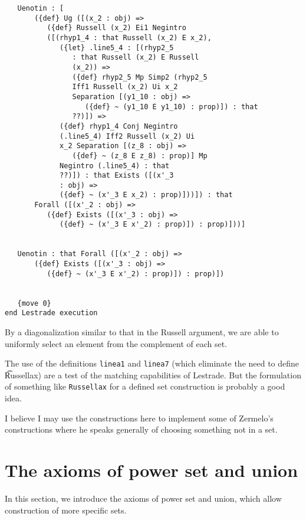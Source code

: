 \documentclass[12pt]{article}
\begin{document}
\begin{verbatim}
   Uenotin : [
       ({def} Ug ([(x_2 : obj) => 
          ({def} Russell (x_2) Ei1 Negintro 
          ([(rhyp1_4 : that Russell (x_2) E x_2), 
             ({let} .line5_4 : [(rhyp2_5 
                : that Russell (x_2) E Russell 
                (x_2)) => 
                ({def} rhyp2_5 Mp Simp2 (rhyp2_5 
                Iff1 Russell (x_2) Ui x_2 
                Separation [(y1_10 : obj) => 
                   ({def} ~ (y1_10 E y1_10) : prop)]) : that 
                ??)]) => 
             ({def} rhyp1_4 Conj Negintro 
             (.line5_4) Iff2 Russell (x_2) Ui 
             x_2 Separation [(z_8 : obj) => 
                ({def} ~ (z_8 E z_8) : prop)] Mp 
             Negintro (.line5_4) : that 
             ??)]) : that Exists ([(x'_3 
             : obj) => 
             ({def} ~ (x'_3 E x_2) : prop)]))]) : that 
       Forall ([(x'_2 : obj) => 
          ({def} Exists ([(x'_3 : obj) => 
             ({def} ~ (x'_3 E x'_2) : prop)]) : prop)]))]


   Uenotin : that Forall ([(x'_2 : obj) => 
       ({def} Exists ([(x'_3 : obj) => 
          ({def} ~ (x'_3 E x'_2) : prop)]) : prop)])


   {move 0}
end Lestrade execution
\end{verbatim}

By a diagonalization similar to that in the Russell argument, we are able to uniformly select an element from the complement of each set.

The use of the definitions {\tt linea1} and {\tt linea7} (which eliminate the need to define {\t Russellax}) are a test of the matching capabilities of Lestrade.  But the formulation of something like {\tt Russellax} for a defined set construction is probably a good idea.

I believe I may use the constructions here to implement some of Zermelo's constructions where he speaks generally of choosing something not in a set.

\section{The axioms of power set and union}

In this section, we introduce the axioms of power set and union, which allow construction of more specific sets.
\end{document}
